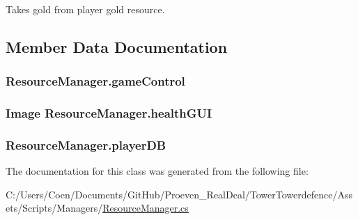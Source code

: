 Takes gold from player \textquotesingle{}gold\textquotesingle{} resource\textquotesingle{}. 



\subsection{Member Data Documentation}
\subsubsection[{\texorpdfstring{game\+Control}{gameControl}}]{ Resource\+Manager.\+game\+Control}\hypertarget{class_resource_manager_a9cba58c85ab8834625b7a2880fd26efe}{}\label{class_resource_manager_a9cba58c85ab8834625b7a2880fd26efe}
\subsubsection[{\texorpdfstring{health\+G\+UI}{healthGUI}}]{\setlength{\rightskip}{0pt plus 5cm}Image Resource\+Manager.\+health\+G\+UI}\hypertarget{class_resource_manager_a45c0d8fe1cb632b0b76f8e83b63573e6}{}\label{class_resource_manager_a45c0d8fe1cb632b0b76f8e83b63573e6}
\subsubsection[{\texorpdfstring{player\+DB}{playerDB}}]{ Resource\+Manager.\+player\+DB}\hypertarget{class_resource_manager_a71e5ec59f28266a6368ff748f749c485}{}\label{class_resource_manager_a71e5ec59f28266a6368ff748f749c485}


The documentation for this class was generated from the following file\+:\begin{DoxyCompactItemize}
\item 
C\+:/\+Users/\+Coen/\+Documents/\+Git\+Hub/\+Proeven\+\_\+\+Real\+Deal/\+Tower\+Towerdefence/\+Assets/\+Scripts/\+Managers/\hyperlink{_resource_manager_8cs}{Resource\+Manager.\+cs}\end{DoxyCompactItemize}
